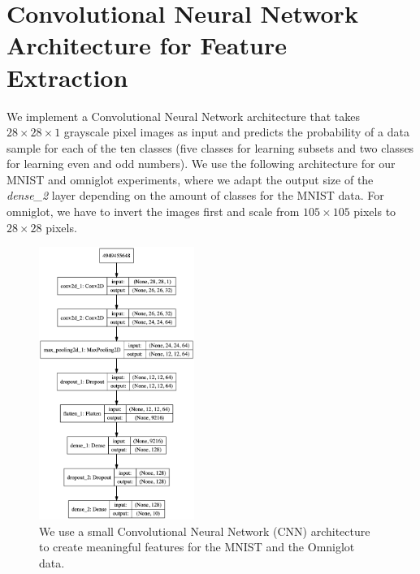 \chapter{Convolutional Neural Network Architecture for Feature Extraction}
\label{sec:cnnarchitecture}

We implement a Convolutional Neural Network architecture that takes $28 \times 28 \times 1$ grayscale pixel images as input and predicts the probability of a data sample for each of the ten classes (five classes for learning subsets and two classes for learning even and odd numbers). We use the following architecture for our MNIST and omniglot experiments, where we adapt the output size of the \textit{dense\_2} layer depending on the amount of classes for the MNIST data. For omniglot, we have to invert the images first and scale from $105 \times 105$ pixels to $28 \times 28$ pixels.

\begin{figure}[H]
    \centering
    \includegraphics[width=0.45\textwidth]{images/model}
    \caption{We use a small Convolutional Neural Network (CNN) architecture to create meaningful features for the MNIST and the Omniglot data.}
    \label{fig:model}
\end{figure}